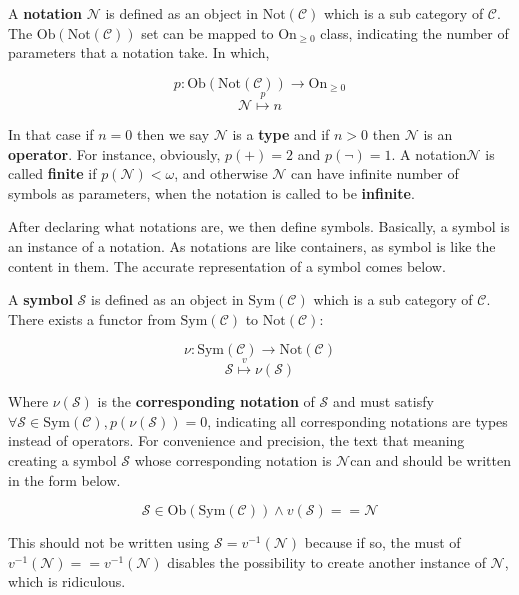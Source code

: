 \documentclass{article}
\begin{document}
 A \textbf{ notation} \(\mathcal{N}\) is defined as an object in \(\text{Not}(\mathcal{C})\) which is a sub category of \(\mathcal{C}\). The \(\text{Ob}(\text{Not}(\mathcal{C}))\) set can be mapped to \(\text{On}_{\geq 0}\) class, indicating the number of parameters that a notation take. In which,

\[\mathit{p}:\text{Ob}(\text{Not}(\mathcal{C}))\to \text{On}_{\geq 0}\]
\[\mathcal{N}\overset{\mathit{p}}{\mapsto }n\]

In that case if \(n=0\) then we say \(\mathcal{N}\) is a \textbf{ type} and if \(n>0\) then \(\mathcal{N}\) is an \textbf{ operator}. For instance, obviously, \(\mathit{p}(+)=2\) and \(\mathit{p}(\neg )=1\). A notation\(\mathcal{N}\) is called \textbf{ finite} if \(\mathit{p}(\mathcal{N})<\omega\), and otherwise \(\mathcal{N}\) can have infinite number of symbols as parameters, when the notation is called to be \textbf{ infinite}.

After declaring what notations are, we then define symbols. Basically, a symbol is an instance of a notation. As notations are like containers, as symbol is like the content in them. The accurate representation of a symbol comes below.

 A \textbf{ symbol} \(\mathcal{S}\) is defined as an object in \(\text{Sym}(\mathcal{C})\) which is a sub category of \(\mathcal{C}\). There exists a functor from \(\text{Sym}(\mathcal{C})\) to \(\text{Not}(\mathcal{C})\):

\[\nu :\text{Sym}(\mathcal{C})\to \text{Not}(\mathcal{C})\]
\[\mathcal{S}\overset{\mathit{v}}{\mapsto }\nu (\mathcal{S})\]

Where \(\nu (\mathcal{S})\) is the \textbf{ corresponding notation} of \(\mathcal{S}\) and must satisfy \(\forall \mathcal{S}\in \text{Sym}(\mathcal{C}),\mathit{p}(\nu (\mathcal{S}))=0\), indicating all corresponding notations are types instead of operators. For convenience and precision, the text that meaning creating a symbol \(\mathcal{S}\) whose corresponding notation is \(\mathcal{N}\)can and should be written in the form below.

\[\mathcal{S}\in \text{Ob}(\text{Sym}(\mathcal{C}))\land \mathit{v}(\mathcal{S})==\mathcal{N}\]

This should not be written using \(\mathcal{S}=\mathit{v}^{-1}(\mathcal{N})\) because if so, the must of \(\mathit{v}^{-1}(\mathcal{N})==\mathit{v}^{-1}(\mathcal{N})\) disables the possibility to create another instance of \(\mathcal{N}\), which is ridiculous. 
\end{document}
